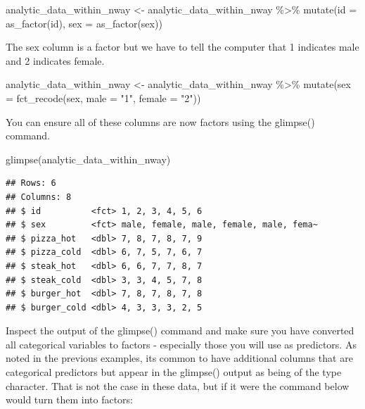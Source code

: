 \documentclass[
]{krantz}
\makeatletter
\newenvironment{Shaded}{\begin{snugshade}}{\end{snugshade}}
\newcommand{\AttributeTok}[1]{\textcolor[rgb]{0.61,0.61,0.61}{#1}}
\newcommand{\FunctionTok}[1]{\textcolor[rgb]{0,0,0}{#1}}
\newcommand{\NormalTok}[1]{#1}
\newcommand{\OtherTok}[1]{\textcolor[rgb]{0.37,0.37,0.37}{#1}}
\newcommand{\SpecialCharTok}[1]{\textcolor[rgb]{0,0,0}{#1}}
\newcommand{\StringTok}[1]{\textcolor[rgb]{0.5,0.5,0.5}{#1}}
\newenvironment{kframe}{%
\medskip{}
\setlength{\fboxsep}{.8em}
 \def\at@end@of@kframe{}%
 \ifinner\ifhmode%
  \def\at@end@of@kframe{\end{minipage}}%
  \begin{minipage}{\columnwidth}%
 \fi\fi%
 \def\FrameCommand##1{\hskip\@totalleftmargin \hskip-\fboxsep
 \colorbox{shadecolor}{##1}\hskip-\fboxsep
     \hskip-\linewidth \hskip-\@totalleftmargin \hskip\columnwidth}%
 \MakeFramed {\advance\hsize-\width
   \@totalleftmargin\z@ \linewidth\hsize
   \@setminipage}}%
 {\par\unskip\endMakeFramed%
 \at@end@of@kframe}
\renewenvironment{Shaded}{\begin{kframe}}{\end{kframe}}
\makeatother
\begin{document}
\begin{Shaded}
\begin{Highlighting}[]
\NormalTok{analytic\_data\_within\_nway }\OtherTok{\textless{}{-}}\NormalTok{ analytic\_data\_within\_nway }\SpecialCharTok{\%\textgreater{}\%}
  \FunctionTok{mutate}\NormalTok{(}\AttributeTok{id =} \FunctionTok{as\_factor}\NormalTok{(id),}
         \AttributeTok{sex =} \FunctionTok{as\_factor}\NormalTok{(sex))}
\end{Highlighting}
\end{Shaded}

The sex column is a factor but we have to tell the computer that 1 indicates male and 2 indicates female.

\begin{Shaded}
\begin{Highlighting}[]
\NormalTok{analytic\_data\_within\_nway }\OtherTok{\textless{}{-}}\NormalTok{ analytic\_data\_within\_nway }\SpecialCharTok{\%\textgreater{}\%}
  \FunctionTok{mutate}\NormalTok{(}\AttributeTok{sex =} \FunctionTok{fct\_recode}\NormalTok{(sex,}
                          \AttributeTok{male =} \StringTok{"1"}\NormalTok{,}
                          \AttributeTok{female =} \StringTok{"2"}\NormalTok{))}
\end{Highlighting}
\end{Shaded}

You can ensure all of these columns are now factors using the glimpse() command.

\begin{Shaded}
\begin{Highlighting}[]
\FunctionTok{glimpse}\NormalTok{(analytic\_data\_within\_nway)}
\end{Highlighting}
\end{Shaded}

\begin{verbatim}
## Rows: 6
## Columns: 8
## $ id          <fct> 1, 2, 3, 4, 5, 6
## $ sex         <fct> male, female, male, female, male, fema~
## $ pizza_hot   <dbl> 7, 8, 7, 8, 7, 9
## $ pizza_cold  <dbl> 6, 7, 5, 7, 6, 7
## $ steak_hot   <dbl> 6, 6, 7, 7, 8, 7
## $ steak_cold  <dbl> 3, 3, 4, 5, 7, 8
## $ burger_hot  <dbl> 7, 8, 7, 8, 7, 8
## $ burger_cold <dbl> 4, 3, 3, 3, 2, 5
\end{verbatim}

Inspect the output of the glimpse() command and make sure you have converted all categorical variables to factors - especially those you will use as predictors. As noted in the previous examples, its common to have additional columns that are categorical predictors but appear in the glimpse() output as being of the type character. That is not the case in these data, but if it were the command below would turn them into factors:
\end{document}
